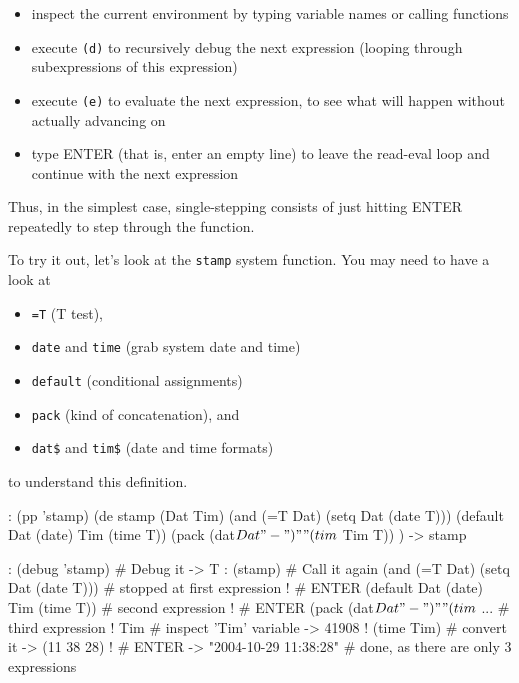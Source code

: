 \begin{itemize}
\item inspect the current environment by typing variable names or calling
   functions
\item execute \texttt{(d)} to recursively debug the next expression (looping
   through subexpressions of this expression)
\item execute \texttt{(e)} to evaluate the next expression, to see what will
   happen without actually advancing on
\item type ENTER (that is, enter an empty line) to leave the read-eval loop
   and continue with the next expression
\end{itemize}

Thus, in the simplest case, single-stepping consists of just hitting
ENTER repeatedly to step through the function.

To try it out, let's look at the \texttt{stamp} system function. You may need
to have a look at

\begin{itemize}
\item \texttt{=T} (T test),
\item \texttt{date} and \texttt{time} (grab system date and time)
\item \texttt{default} (conditional assignments)
\item \texttt{pack} (kind of concatenation), and
\item \texttt{dat\$} and \texttt{tim\$} (date and time formats)
\end{itemize}

to understand this definition.


\begin{wideverbatim}
: (pp 'stamp)
(de stamp (Dat Tim)
   (and (=T Dat) (setq Dat (date T)))
   (default Dat (date) Tim (time T))
   (pack (dat$ Dat "-") " " (tim$ Tim T)) )
-> stamp
\end{wideverbatim}


\begin{wideverbatim}
: (debug 'stamp)                       # Debug it
-> T
: (stamp)                              # Call it again
(and (=T Dat) (setq Dat (date T)))     # stopped at first expression
!                                      # ENTER
(default Dat (date) Tim (time T))      # second expression
!                                      # ENTER
(pack (dat$ Dat "-") " " (tim$ ...     # third expression
! Tim                                  # inspect 'Tim' variable
-> 41908
! (time Tim)                           # convert it
-> (11 38 28)
!                                      # ENTER
-> "2004-10-29 11:38:28"               # done, as there are only 3 expressions
\end{wideverbatim}

